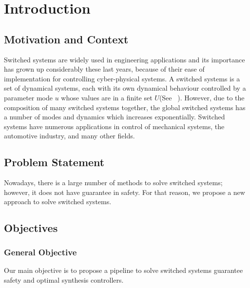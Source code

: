     \chapter{Introduction}
    \section{Motivation and Context}

    Switched systems are widely used in engineering applications and its 
    importance has grown up considerably these last years, because of their 
    ease of implementation for controlling cyber-physical systems.
    A switched systems is a set of dynamical systems, each with its own 
    dynamical behaviour controlled by a parameter mode $u$ whose values 
    are in a finite set $U$(See ~\cite{liberzon2003switching}). However, due to the composition of many switched systems together, the global switched systems has a number of modes and dynamics which increases exponentially. 
    Switched systems have numerous applications in control of mechanical systems, the automotive industry, and many other fields. 

    \section{Problem Statement}
    Nowadays, there is a large number of methods to solve switched systems;
    however, it does not have guarantee in safety. For that reason, we 
    propose a new approach to solve switched systems. 
    
    \section{Objectives}

        \subsection*{General Objective}
        Our main objective is to propose a pipeline to solve switched systems guarantee safety and optimal synthesis controllers. 

